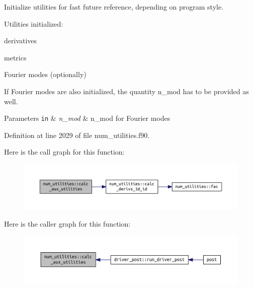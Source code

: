 Initialize utilities for fast future reference, depending on program style. 

Utilities initialized\+:
\begin{DoxyItemize}
\item derivatives
\item metrics
\item Fourier modes (optionally)
\end{DoxyItemize}

If Fourier modes are also initialized, the quantity {\ttfamily n\+\_\+mod} has to be provided as well.


\begin{DoxyParams}[1]{Parameters}
\mbox{\tt in}  & {\em n\+\_\+mod} & n\+\_\+mod for Fourier modes \\
\hline
\end{DoxyParams}


Definition at line 2029 of file num\+\_\+utilities.\+f90.

Here is the call graph for this function\+:\nopagebreak
\begin{figure}[H]
\begin{center}
\leavevmode
\includegraphics[width=350pt]{namespacenum__utilities_af461ae4c95a7a45da875dcf311e323f5_cgraph}
\end{center}
\end{figure}
Here is the caller graph for this function\+:\nopagebreak
\begin{figure}[H]
\begin{center}
\leavevmode
\includegraphics[width=350pt]{namespacenum__utilities_af461ae4c95a7a45da875dcf311e323f5_icgraph}
\end{center}
\end{figure}
\mbox{\label{namespacenum__utilities_a4dffe3beba7165dd17cff19a99a9e2ac}} 
